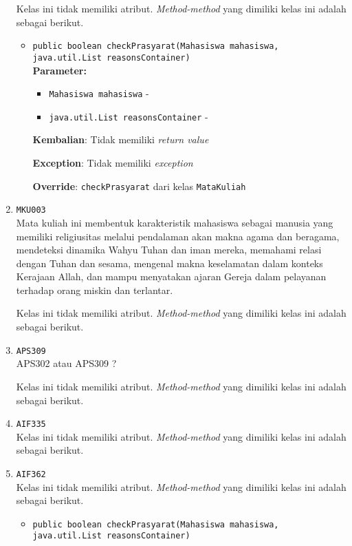 \documentclass{article}
\begin{document}
\begin{enumerate}
Kelas ini tidak memiliki atribut. \textit{Method-method} yang dimiliki kelas ini adalah sebagai berikut.
\begin{itemize}
\item \texttt{public boolean checkPrasyarat(Mahasiswa mahasiswa, java.util.List reasonsContainer)}\\ 


\textbf{Parameter:}\begin{itemize}
\item \texttt{Mahasiswa mahasiswa} - 
\item \texttt{java.util.List reasonsContainer} - 
\end{itemize}
\textbf{Kembalian}: Tidak memiliki \textit{return value}

\textbf{Exception}: Tidak memiliki \textit{exception}

\textbf{Override}: \texttt{checkPrasyarat} dari kelas \texttt{MataKuliah}

\end{itemize}
\item \texttt{MKU003}\\ 
Mata kuliah ini membentuk karakteristik mahasiswa sebagai manusia yang memiliki religiusitas
 melalui pendalaman akan makna agama dan beragama, mendeteksi dinamika Wahyu Tuhan dan iman 
 mereka, memahami relasi dengan Tuhan dan sesama, mengenal makna keselamatan dalam konteks 
 Kerajaan Allah, dan mampu menyatakan ajaran Gereja dalam pelayanan terhadap orang miskin dan
 terlantar.

Kelas ini tidak memiliki atribut. \textit{Method-method} yang dimiliki kelas ini adalah sebagai berikut.
\begin{itemize}
\end{itemize}
\item \texttt{APS309}\\ 
APS302 atau APS309 ?

Kelas ini tidak memiliki atribut. \textit{Method-method} yang dimiliki kelas ini adalah sebagai berikut.
\begin{itemize}
\end{itemize}
\item \texttt{AIF335}\\ 
Kelas ini tidak memiliki atribut. \textit{Method-method} yang dimiliki kelas ini adalah sebagai berikut.
\begin{itemize}
\end{itemize}
\item \texttt{AIF362}\\ 
Kelas ini tidak memiliki atribut. \textit{Method-method} yang dimiliki kelas ini adalah sebagai berikut.
\begin{itemize}
\item \texttt{public boolean checkPrasyarat(Mahasiswa mahasiswa, java.util.List reasonsContainer)}\\ 



\end{itemize}
\end{enumerate}
\end{document}
